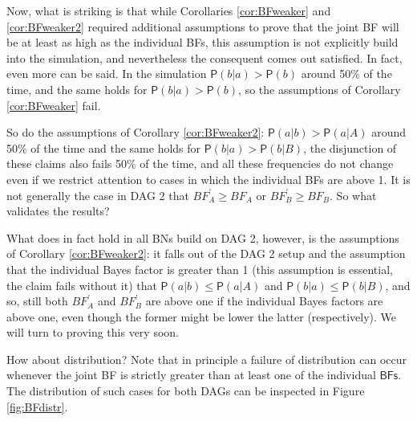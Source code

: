 \documentclass[
  10pt,
  dvipsnames,enabledeprecatedfontcommands]{scrartcl}
\newcommand{\pr}[1]{\ensuremath{\mathsf{P}(#1)}}
\begin{document}
Now, what is striking is that while Corollaries \ref{cor:BFweaker} and
\ref{cor:BFweaker2} required additional assumptions to prove that the
joint \textsf{BF} will be at least as high as the individual
\textsf{BFs}, this assumption is not explicitly build into the
simulation, and nevertheless the consequent comes out satisfied. In
fact, even more can be said. In the simulation
\(\pr{b \vert a}> \pr{b}\) around 50\% of the time, and the same holds
for \(\pr{b \vert a}> \pr{b}\), so the assumptions of Corollary
\ref{cor:BFweaker} fail.

So do the assumptions of Corollary \ref{cor:BFweaker2}:
\(\pr{a \vert b } > \pr {a \vert A}\) around 50\% of the time and the
same holds for \(\pr{b \vert a } > \pr {b \vert B}\), the disjunction of
these claims also fails 50\% of the time, and all these frequencies do
not change even if we restrict attention to cases in which the
individual \textsf{BFs} are above 1. It is not generally the case in
\textsf{DAG 2} that \(BF^{'}_{A} \geq BF_{A}\) or
\(BF^{'}_{B} \geq BF_{B}\). So what validates the results?

What does in fact hold in all \textsf{BNs} build on \textsf{DAG 2},
however, is the assumptions of Corollary \ref{cor:BFweaker2}: it falls
out of the \textsf{DAG 2} setup and the assumption that the individual
Bayes factor is greater than 1 (this assumption is essential, the claim
fails without it) that \(\pr{a \vert b} \leq \pr{a \vert A}\) and
\(\pr{b \vert a} \leq \pr{b \vert B}\), and so, still both
\(BF^{'}_{A}\) and \(BF^{'}_{B}\) are above one if the individual Bayes
factors are above one, even though the former might be lower the latter
(respectively). We will turn to proving this very soon.

How about distribution? Note that in principle a failure of distribution
can occur whenever the joint \textsf{BF} is strictly greater than at
least one of the individual \(\textsf{BFs}\). The distribution of such
cases for both DAGs can be inspected in Figure \ref{fig:BFdistr}.

\vspace{1mm}
\footnotesize

\normalsize
\end{document}
